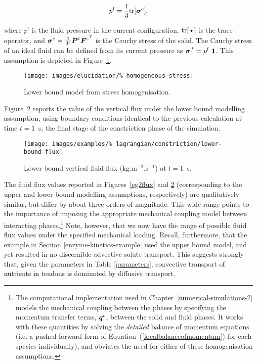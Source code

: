 \begin{equation}
p^{\mathrm{f}} = \frac{1}{3} \mathrm{tr}[\mbox{\boldmath$\sigma$}^{c}],
\label{equalpr}
\end{equation}

\noindent where $p^{\mathrm{f}}$ is the fluid pressure in the current
configuration, $\mbox{tr[\textbullet]}$ is the trace operator,
and $\mbox{\boldmath$\sigma$}^{c}=\frac{1}{\mathrm{J^{c}}} \mbox{\boldmath$ P$}^{\mathrm{c}}
\mbox{\boldmath$ F$}^{\mathrm{c}^{\mathrm{T}}}$ is the Cauchy stress of the solid. The
Cauchy stress of an ideal fluid can be defined from its current
pressure as \mbox{$\Bsigma^{f}= p^{\mathrm{f}}\ \bone$.} This
assumption is depicted in Figure~\ref{lower-bound-model}.

\begin{figure}[ht]
  \centering
  \texttt{[image: images/elucidation/\%
    homogeneous-stress]}
  \caption{Lower bound model from stress homogenisation.}
  \label{lower-bound-model}
\end{figure}

Figure~{\ref{lowerbound}} reports the value of the vertical flux under
the lower bound modelling assumption, using boundary conditions
identical to the previous calculation at time $t=1$~s, the final stage
of the constriction phase of the simulation.

\begin{figure}[!hpt]
  \centering
  \texttt{[image: images/examples/\%
    lagrangian/constriction/lower-bound-flux]}
  \caption{Lower bound vertical fluid flux (kg.m$^{-2}$.s$^{-1}$) at
    $t=1$~s.}
  \label{lowerbound}
\end{figure}

The fluid flux values reported in Figures~\ref{eg2flux} and
\ref{lowerbound} (corresponding to the upper and lower bound modelling
assumptions, respectively) are qualitatively similar, but differ by
about three orders of magnitude. This wide range points to the
importance of imposing the appropriate mechanical coupling model
between interacting phases.\footnote{The computational implementation
  used in Chapter~\ref{numerical-simulations-2} models the mechanical
  coupling between the phases by specifying the momentum transfer
  terms, $\mbox{\boldmath$ q$}^{\iota}$, between the solid and fluid phases. It works
  with these quantities by solving the {\em detailed} balance of
  momentum equations (i.e. a pushed-forward form of
  Equation~(\ref{localbalanceofmomentum}) for each species
  individually), and obviates the need for either of these
  homogenisation assumptions.}  Note, however, that we now have the
range of possible fluid flux values under the specified mechanical
loading. Recall, furthermore, that the example in Section
\ref{enzyme-kinetics-example} used the upper bound model, and yet
resulted in no discernible advective solute transport. This suggests
strongly that, given the parameters in Table \ref{parameters},
convective transport of nutrients in tendons is dominated by diffusive
transport.

